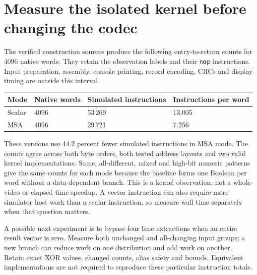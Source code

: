 \section{Measure the isolated kernel before changing the codec}
The verified construction sources produce the following entry-to-return counts for
4096 native words. They retain the observation labels and their \texttt{nop}
instructions. Input preparation, assembly, console printing, record encoding, CRCs
and display timing are outside this interval.
\begin{longtable}{p{30mm}p{30mm}p{38mm}p{43mm}}
  \toprule Mode & Native words & Simulated instructions & Instructions per word \\\midrule
  Scalar        & 4096         & 53\,269                & 13.005                \\
  MSA           & 4096         & 29\,721                & 7.256                 \\\bottomrule
\end{longtable}
These versions use 44.2 percent fewer simulated instructions in MSA mode. The counts
agree across both byte orders, both tested address layouts and two valid kernel
implementations. Same, all-different, mixed and high-bit numeric patterns give the
same counts for each mode because the baseline forms one Boolean per word without
a data-dependent branch. This is a kernel observation, not a whole-video or elapsed-time
speedup. A vector instruction can also require more simulator host work than a scalar
instruction, so measure wall time separately when that question matters.

A possible next experiment is to bypass four lane extractions when an entire result
vector is zero. Measure both unchanged and all-changing input groups; a new branch
can reduce work on one distribution and add work on another. Retain exact XOR values,
changed counts, alias safety and bounds. Equivalent implementations are not required
to reproduce these particular instruction totals.
